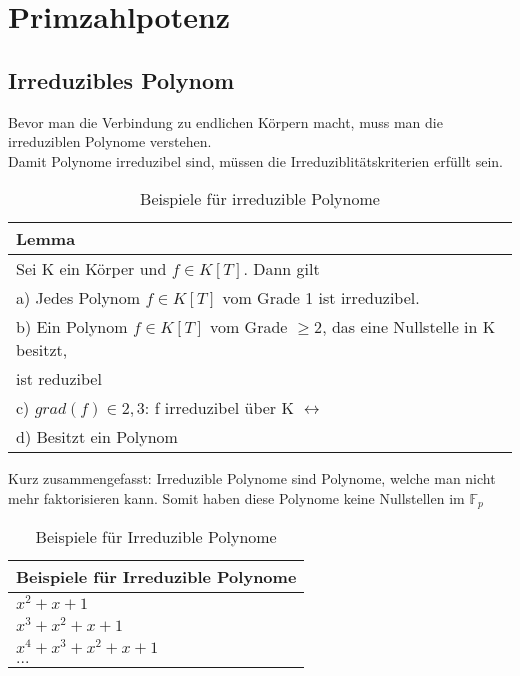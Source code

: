 \section{Primzahlpotenz}

\subsection*{Irreduzibles Polynom}


Bevor man die Verbindung zu endlichen Körpern macht, muss man die irreduziblen Polynome verstehen.\\
Damit Polynome irreduzibel sind, müssen die Irreduziblitätskriterien erfüllt sein.\\

\begin{table}[!ht]
    \centering
        \begin{tabular}{l}
            \toprule
            \textbf{Lemma}\\
            \midrule
            Sei K ein Körper und $ f \in K[T]$. Dann gilt\\
            a) Jedes Polynom $ f \in K[T]$ vom Grade 1 ist irreduzibel.\\
            b) Ein Polynom $ f \in K[T]$ vom Grade $\geq 2$, das eine Nullstelle in K besitzt,\\
             ist reduzibel \\
            c) $grad(f) \in {2,3}$: f irreduzibel über K $ \leftrightarrow $ \\
            d) Besitzt ein Polynom $ $\\
           \bottomrule
        \end{tabular}
        \caption{Beispiele für irreduzible Polynome}
        \label{tab3}
    \end{table}


Kurz zusammengefasst: Irreduzible Polynome sind Polynome, welche man nicht mehr faktorisieren kann. Somit haben diese Polynome keine Nullstellen im $\mathbb{F}_{p} $


\begin{table}[!ht]
    \centering
        \begin{tabular}{l}
            \toprule
            \textbf{Beispiele für Irreduzible Polynome}\\
            \midrule
            $ x^2+ x + 1$\\
            $x^3 + x^2 + x + 1$ \\
            $x^4 + x^3  + x^2 + x + 1$\\
            $...$\\
           \bottomrule
        \end{tabular}
        \caption{Beispiele für Irreduzible Polynome}
        \label{tab3}
    \end{table}

